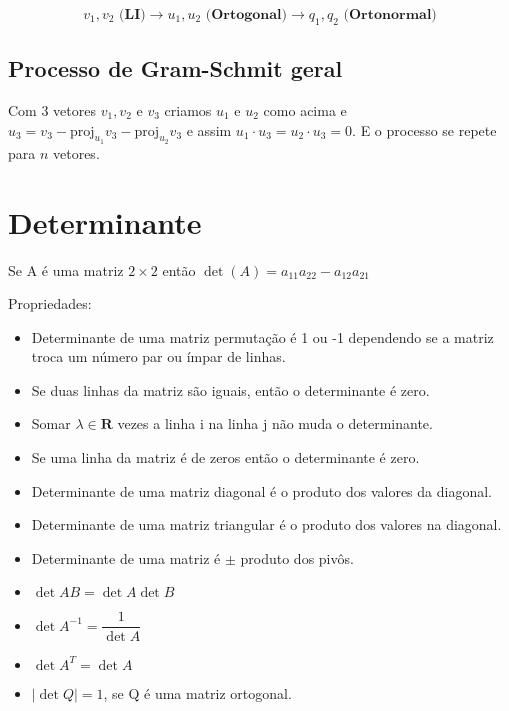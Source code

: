 \documentclass[12pt]{article}
\begin{document}
$$v_1, v_2 \textbf{ (LI)} \xrightarrow{} u_1, u_2 \textbf{ (Ortogonal)} \xrightarrow{} q_1, q_2 \textbf{ (Ortonormal)}$$

\subsection*{Processo de Gram-Schmit geral}
Com 3 vetores $v_1, v_2$ e $v_3$ criamos $u_1$ e $u_2$ como acima e $u_3 = v_3 - \text{proj}_{u_1} v_3 - \text{proj}_{u_2} v_3$ e assim $u_1 \cdot u_3 = u_2 \cdot u_3 = 0$. E o processo se repete para $n$ vetores.

\section*{Determinante}
Se A é uma matriz $2 \times 2$ então $\det(A) = a_{11}a_{22} - a_{12}a_{21}$

Propriedades:
\begin{itemize}
    \item Determinante de uma matriz permutação é 1 ou -1 dependendo se a matriz troca um número par ou ímpar de linhas.
    
    \item Se duas linhas da matriz são iguais, então o determinante é zero.
    
    \item Somar $\lambda \in \mathbf{R}$ vezes a linha i na linha j não muda o determinante.
    
    \item Se uma linha da matriz é de zeros então o determinante é zero.
    
    \item Determinante de uma matriz diagonal é o produto dos valores da diagonal.
    
    \item Determinante de uma matriz triangular é o produto dos valores na diagonal.
    
    \item Determinante de uma matriz é $\pm$ produto dos pivôs.
    
    \item $\det AB = \det A \det B$
    
    \item $\det A^{-1} = \dfrac{1}{\det A}$
    
    \item $\det A^T = \det A$
    
    \item $|\det Q| = 1$, se Q é uma matriz ortogonal.
\end{itemize}
\end{document}
